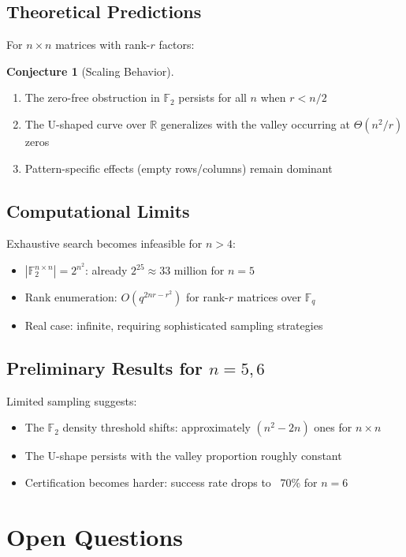 \documentclass{article}
\theoremstyle{definition}
\newtheorem{conjecture}[theorem]{Conjecture}
\begin{document}
\subsection{Theoretical Predictions}

For $n \times n$ matrices with rank-$r$ factors:

\begin{conjecture}[Scaling Behavior]
\begin{enumerate}
\item The zero-free obstruction in $\mathbb{F}_2$ persists for all $n$ when $r < n/2$
\item The U-shaped curve over $\mathbb{R}$ generalizes with the valley occurring at $\Theta(n^2/r)$ zeros
\item Pattern-specific effects (empty rows/columns) remain dominant
\end{enumerate}
\end{conjecture}

\subsection{Computational Limits}

Exhaustive search becomes infeasible for $n > 4$:
\begin{itemize}
\item $|\mathbb{F}_2^{n \times n}| = 2^{n^2}$: already $2^{25} \approx 33$ million for $n = 5$
\item Rank enumeration: $O(q^{2nr - r^2})$ for rank-$r$ matrices over $\mathbb{F}_q$
\item Real case: infinite, requiring sophisticated sampling strategies
\end{itemize}

\subsection{Preliminary Results for $n = 5,6$}

Limited sampling suggests:
\begin{itemize}
\item The $\mathbb{F}_2$ density threshold shifts: approximately $(n^2 - 2n)$ ones for $n \times n$
\item The U-shape persists with the valley proportion roughly constant
\item Certification becomes harder: success rate drops to ~70\% for $n = 6$
\end{itemize}

\section{Open Questions}
\end{document}
